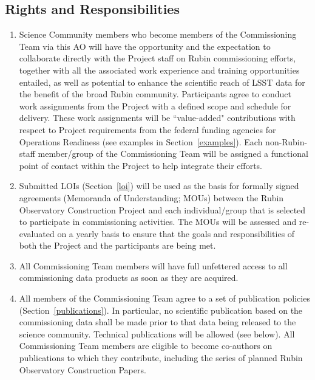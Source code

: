 \documentclass[SE,authoryear,toc]{lsstdoc}
\begin{document}
\subsection{Rights and Responsibilities}
\label{rights_responsibilities}

\begin{enumerate}

\item Science Community members who become members of the Commissioning Team via this AO will have the opportunity and the expectation to collaborate directly with the Project staff on Rubin commissioning efforts, together with all the associated work experience and training opportunities entailed, as well as potential to enhance the scientific reach of LSST data for the benefit of the broad Rubin community. Participants agree to conduct work assignments from the Project with a defined scope and schedule for delivery. These work assignments will be ``value-added" contributions with respect to Project requirements from the federal funding agencies for Operations Readiness (see examples in Section~\ref{examples}). Each non-Rubin-staff member/group of the Commissioning Team will be assigned a functional point of contact within the Project to help integrate their efforts.

\item Submitted LOIs (Section~\ref{loi}) will be used as the basis for formally signed agreements (Memoranda of Understanding; MOUs) between the Rubin Observatory Construction Project and each individual/group that is selected to participate in commissioning activities. The MOUs will be assessed and re-evaluated on a yearly basis to ensure that the goals and responsibilities of both the Project and the participants are being met. 

\item All Commissioning Team members will have full unfettered access to all commissioning data products as soon as they are acquired. 

\item All members of the Commissioning Team agree to a set of publication policies (Section~\ref{publications}). In particular, no scientific publication based on the commissioning data shall be made prior to that data being released to the science community.  Technical publications will be allowed (see below). All Commissioning Team members are eligible to become co-authors on publications to which they contribute, including the series of planned Rubin Observatory Construction Papers.


\end{enumerate}
\end{document}
